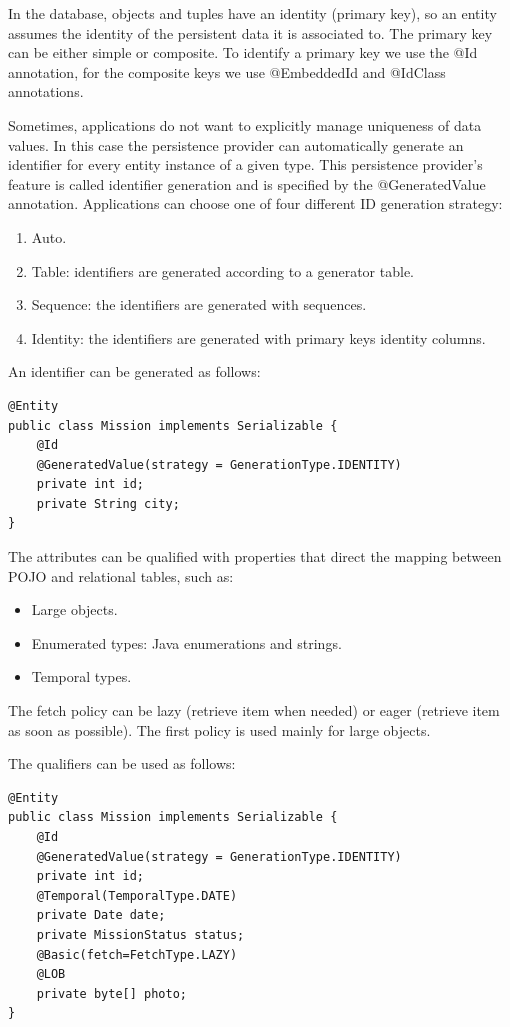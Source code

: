 \documentclass[12pt, a4paper]{report}
\begin{document}
        In the database, objects and tuples have an identity (primary key), so an entity assumes the identity of the persistent data it is associated to. The primary key can be 
        either simple or composite. To identify a primary key we use the @Id annotation, for the composite keys we use @EmbeddedId and @IdClass annotations. 
        
        Sometimes, applications do not want to explicitly manage uniqueness of data values. In this case the persistence provider can automatically generate an identifier 
        for every entity instance of a given type. This persistence provider's feature is called identifier generation and is specified by the @GeneratedValue annotation. 
        Applications can choose one of four different ID generation strategy: 
        \begin{enumerate}
            \item Auto. 
            \item Table: identifiers are generated according to a generator table.
            \item Sequence: the identifiers are generated with sequences. 
            \item Identity: the identifiers are generated with primary keys identity columns. 
        \end{enumerate}
        \begin{example}
            An identifier can be generated as follows: 
            \begin{lstlisting}[style=Java]
@Entity
public class Mission implements Serializable {
    @Id
    @GeneratedValue(strategy = GenerationType.IDENTITY)
    private int id;
    private String city;
}
            \end{lstlisting}
        \end{example}
        The attributes can be qualified with properties that direct the mapping between POJO and relational tables, such as: 
        \begin{itemize}
            \item Large objects.
            \item Enumerated types: Java enumerations and strings. 
            \item Temporal types.
        \end{itemize}
        The fetch policy can be lazy (retrieve item when needed) or eager (retrieve item as soon as possible). The first policy is used mainly for large objects. 
        \begin{example}
            The qualifiers can be used as follows: 
            \begin{lstlisting}[style=Java]
@Entity
public class Mission implements Serializable {
    @Id
    @GeneratedValue(strategy = GenerationType.IDENTITY)
    private int id;
    @Temporal(TemporalType.DATE)
    private Date date;
    private MissionStatus status;
    @Basic(fetch=FetchType.LAZY)
    @LOB
    private byte[] photo;
}
            \end{lstlisting}
        \end{example}
\end{document}
